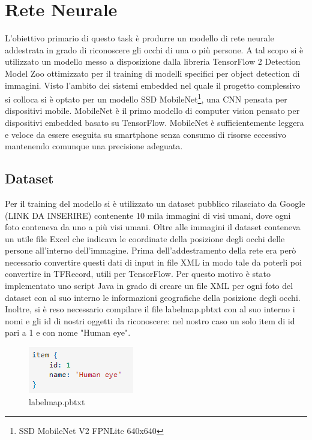\documentclass[11pt]{article}
\begin{document}
\newpage

\section{Rete Neurale}
L’obiettivo primario di questo task è produrre un modello di rete neurale addestrata in grado di riconoscere gli occhi di una o più persone. A tal scopo si è utilizzato un modello messo a disposizione dalla libreria TensorFlow 2 Detection Model Zoo ottimizzato per il training di modelli specifici per object detection di immagini. Visto l’ambito dei sistemi embedded nel quale il progetto complessivo si colloca si è optato per un modello SSD MobileNet\footnote{SSD MobileNet V2 FPNLite 640x640}, una CNN pensata per dispositivi mobile. MobileNet è il primo modello di computer vision pensato per dispositivi embedded basato su TensorFlow. MobileNet è sufficientemente leggera e veloce da essere eseguita su smartphone senza consumo di risorse eccessivo mantenendo comunque una precisione adeguata.


\subsection{Dataset}
Per il training del modello si è utilizzato un dataset pubblico rilasciato da Google (LINK DA INSERIRE) contenente 10 mila immagini di visi umani, dove ogni foto conteneva da uno a più visi umani.
\newline
Oltre alle immagini il dataset conteneva un utile file Excel che indicava le coordinate della posizione degli occhi delle persone all'interno dell'immagine.
\newline \newline
Prima dell'addestramento della rete era però necessario convertire questi dati di input in file XML in modo tale da poterli poi convertire in TFRecord, utili per TensorFlow. Per questo motivo è stato implementato uno script Java in grado di creare un file XML per ogni foto del dataset con al suo interno le informazioni geografiche della posizione degli occhi. 
Inoltre, si è reso necessario compilare il file labelmap.pbtxt con al suo interno i nomi e gli id di nostri oggetti da riconoscere: nel nostro caso un solo item di id pari a 1 e con nome "Human eye".
\begin{figure}[h]
\caption{labelmap.pbtxt}
\centering
\includegraphics[scale=1]{img/item.png}
\end{figure}
\end{document}
